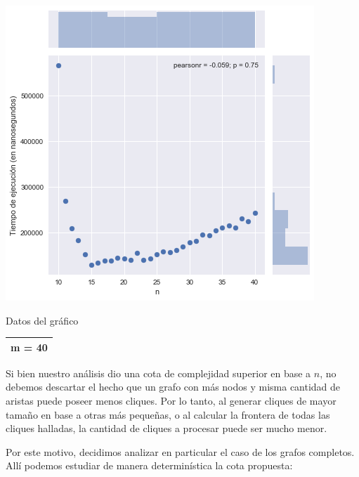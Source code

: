 \noindent
\begin{minipage}{0.55\textwidth}
	\hfill
	\includegraphics[scale=0.6]{img/exact-bad.png}
\end{minipage}
\hfill
\begin{minipage}{0.44\textwidth}
	\begin{center}
		Datos del gráfico

		\begin{tabular}{ | l |}
			\hline
			m = 40 \\
			\hline
		\end{tabular}
	\end{center}
\end{minipage}

Si bien nuestro análisis dio una cota de complejidad superior en base a $n$, no debemos descartar el hecho que un grafo con más nodos y misma cantidad de aristas puede poseer menos cliques. Por lo tanto, al generar cliques de mayor tamaño en base a otras más pequeñas, o al calcular la frontera de todas las cliques halladas, la cantidad de cliques a procesar puede ser mucho menor.

Por este motivo, decidimos analizar en particular el caso de los grafos completos. Allí podemos estudiar de manera determinística la cota propuesta:

